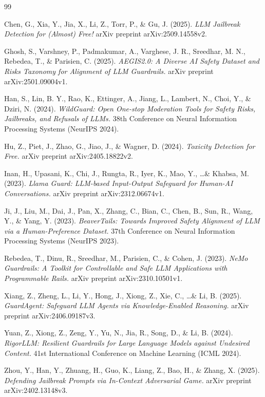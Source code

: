 \documentclass[11pt]{article}
\begin{document}
\begin{thebibliography}{99}

Chen, G., Xia, Y., Jia, X., Li, Z., Torr, P., \& Gu, J. (2025). 
\newblock \textit{LLM Jailbreak Detection for (Almost) Free!} 
\newblock arXiv preprint arXiv:2509.14558v2.

Ghosh, S., Varshney, P., Padmakumar, A., Varghese, J. R., Sreedhar, M. N., Rebedea, T., \& Parisien, C. (2025). 
\newblock \textit{AEGIS2.0: A Diverse AI Safety Dataset and Risks Taxonomy for Alignment of LLM Guardrails.} 
\newblock arXiv preprint arXiv:2501.09004v1.

Han, S., Lin, B. Y., Rao, K., Ettinger, A., Jiang, L., Lambert, N., Choi, Y., \& Dziri, N. (2024). 
\newblock \textit{WildGuard: Open One-stop Moderation Tools for Safety Risks, Jailbreaks, and Refusals of LLMs.} 
\newblock 38th Conference on Neural Information Processing Systems (NeurIPS 2024).

Hu, Z., Piet, J., Zhao, G., Jiao, J., \& Wagner, D. (2024). 
\newblock \textit{Toxicity Detection for Free.} 
\newblock arXiv preprint arXiv:2405.18822v2.

Inan, H., Upasani, K., Chi, J., Rungta, R., Iyer, K., Mao, Y., \dots \& Khabsa, M. (2023). 
\newblock \textit{Llama Guard: LLM-based Input-Output Safeguard for Human-AI Conversations.} 
\newblock arXiv preprint arXiv:2312.06674v1.

Ji, J., Liu, M., Dai, J., Pan, X., Zhang, C., Bian, C., Chen, B., Sun, R., Wang, Y., \& Yang, Y. (2023). 
\newblock \textit{BeaverTails: Towards Improved Safety Alignment of LLM via a Human-Preference Dataset.} 
\newblock 37th Conference on Neural Information Processing Systems (NeurIPS 2023).

Rebedea, T., Dinu, R., Sreedhar, M., Parisien, C., \& Cohen, J. (2023). 
\newblock \textit{NeMo Guardrails: A Toolkit for Controllable and Safe LLM Applications with Programmable Rails.} 
\newblock arXiv preprint arXiv:2310.10501v1.

Xiang, Z., Zheng, L., Li, Y., Hong, J., Xiong, Z., Xie, C., \dots \& Li, B. (2025). 
\newblock \textit{GuardAgent: Safeguard LLM Agents via Knowledge-Enabled Reasoning.} 
\newblock arXiv preprint arXiv:2406.09187v3.

Yuan, Z., Xiong, Z., Zeng, Y., Yu, N., Jia, R., Song, D., \& Li, B. (2024). 
\newblock \textit{RigorLLM: Resilient Guardrails for Large Language Models against Undesired Content.} 
\newblock 41st International Conference on Machine Learning (ICML 2024).

Zhou, Y., Han, Y., Zhuang, H., Guo, K., Liang, Z., Bao, H., \& Zhang, X. (2025). 
\newblock \textit{Defending Jailbreak Prompts via In-Context Adversarial Game.} 
\newblock arXiv preprint arXiv:2402.13148v3.

\end{thebibliography}
\end{document}
